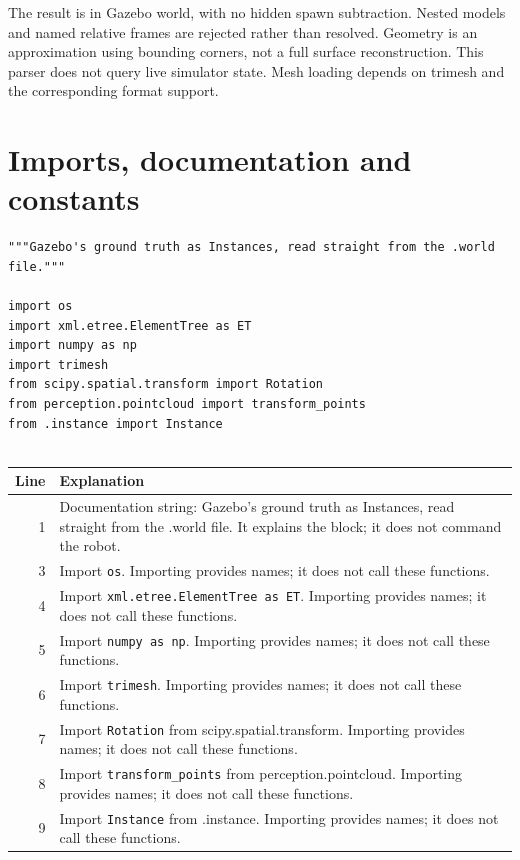 \documentclass[11pt,a4paper]{book}
\begin{document}
The result is in Gazebo world, with no hidden spawn subtraction. Nested models and named relative frames are rejected rather than resolved. Geometry is an approximation using bounding corners, not a full surface reconstruction. This parser does not query live simulator state. Mesh loading depends on trimesh and the corresponding format support.

\section{Imports, documentation and constants}

\begin{lstlisting}[firstnumber=1]
"""Gazebo's ground truth as Instances, read straight from the .world file."""

import os
import xml.etree.ElementTree as ET
import numpy as np
import trimesh
from scipy.spatial.transform import Rotation
from perception.pointcloud import transform_points
from .instance import Instance


\end{lstlisting}

\begin{longtable}{r p{}}

\textbf{Line} & \textbf{Explanation} \\ \hline \endhead

1 & Documentation string: Gazebo's ground truth as Instances, read straight from the .world file. It explains the block; it does not command the robot. \\

3 & Import \texttt{os}. Importing provides names; it does not call these functions. \\

4 & Import \texttt{xml.etree.ElementTree as ET}. Importing provides names; it does not call these functions. \\

5 & Import \texttt{numpy as np}. Importing provides names; it does not call these functions. \\

6 & Import \texttt{trimesh}. Importing provides names; it does not call these functions. \\

7 & Import \texttt{Rotation} from scipy.spatial.transform. Importing provides names; it does not call these functions. \\

8 & Import \texttt{transform\_points} from perception.pointcloud. Importing provides names; it does not call these functions. \\

9 & Import \texttt{Instance} from .instance. Importing provides names; it does not call these functions. \\

\end{longtable}
\end{document}
